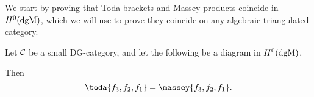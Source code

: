 We start by proving that Toda brackets and Massey products coincide in \( H^0(\operatorname{dgM}) \), which we will use to prove they coincide on any algebraic triangulated category.
\begin{theorem}
    \label{thm:dgm_massey_equal_toda}
    Let \( {\mathcal{C}} \) be a small DG-category, and let the following be a diagram in \( H^0(\operatorname{dgM}) \),
    \begin{center}
    \end{center}
    Then
    \[
        \toda{f_3, f_2, f_1} = \massey{f_3, f_2, f_1}.
    \]
\end{theorem}
